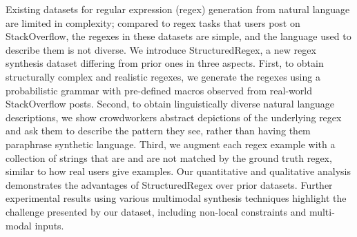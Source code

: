 Existing datasets for regular expression (regex) generation from natural language are limited in complexity; compared to regex tasks that users post on StackOverflow, the regexes in these datasets are simple, and the language used to describe them is not diverse. We introduce StructuredRegex, a new regex synthesis dataset differing from prior ones in three aspects. First, to obtain structurally complex and realistic regexes, we generate the regexes using a probabilistic grammar with pre-defined macros observed from real-world StackOverflow posts. Second, to obtain linguistically diverse natural language descriptions, we show crowdworkers abstract depictions of the underlying regex and ask them to describe the pattern they see, rather than having them paraphrase synthetic language. Third, we augment each regex example with a collection of strings that are and are not matched by the ground truth regex, similar to how real users give examples. Our quantitative and qualitative analysis demonstrates the advantages of StructuredRegex over prior datasets. Further experimental results using various multimodal synthesis techniques highlight the challenge presented by our dataset, including non-local constraints and multi-modal inputs.
